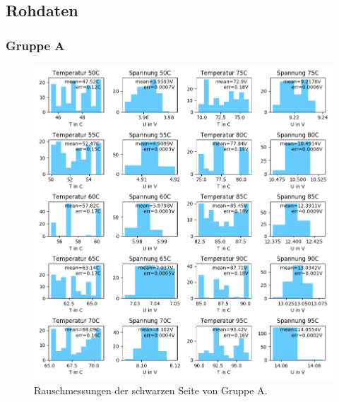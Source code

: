\documentclass[12pt,a4paper]{article}
\begin{document}
\subsection{Rohdaten}
\subsubsection{Gruppe A}

\begin{figure}[h]
\includegraphics[scale=0.8]{Bilder/Rauschen_A_schwarz_2.png}
\caption{Rauschmessungen der schwarzen Seite von Gruppe A.}
\label{fig:RegSpiegel}
\end{figure}
\end{document}
